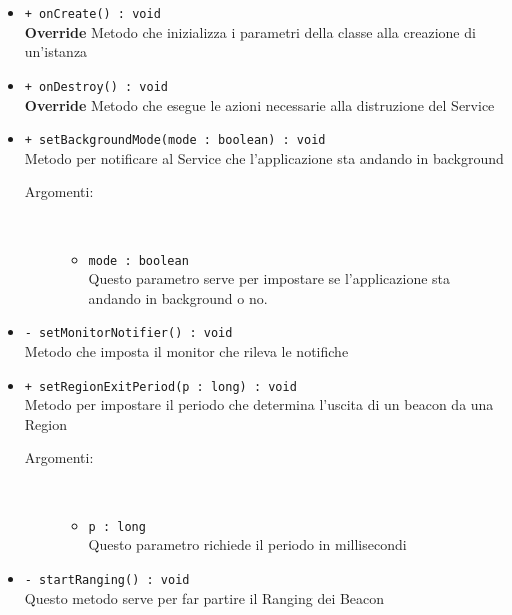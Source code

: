 \documentclass[../DefinizioneDiProdotto.tex]{subfiles}
\begin{document}
\begin{description}
\begin{itemize}
\begin{description}
		\end{description}
		\item \texttt{+ onCreate() : void}\\
		\textbf{Override} Metodo che inizializza i parametri della classe alla creazione di un'istanza
		\item \texttt{+ onDestroy() : void}\\
		\textbf{Override} Metodo che esegue le azioni necessarie alla distruzione del Service
		\item \texttt{+ setBackgroundMode(mode : boolean) : void}\\
		Metodo per notificare al Service che l'applicazione sta andando in background 
		\begin{description}
			\item[Argomenti:] \
			\begin{itemize}
				\item \texttt{mode : boolean}\\
				Questo parametro serve per impostare se l'applicazione sta andando in background o no.\end{itemize}
		\end{description}
		\item \texttt{- setMonitorNotifier() : void}\\
		Metodo che imposta il monitor che rileva le notifiche
		\item \texttt{+ setRegionExitPeriod(p : long) : void}\\
		Metodo per impostare il periodo che determina l'uscita di un beacon da una Region
		\begin{description}
			\item[Argomenti:] \
			\begin{itemize}
				\item \texttt{p : long}\\
				Questo parametro richiede il periodo in millisecondi \end{itemize}
		\end{description}
		\item \texttt{- startRanging() : void}\\
		Questo metodo serve per far partire il Ranging dei Beacon 
	\end{itemize}
\end{description}
\end{document}
